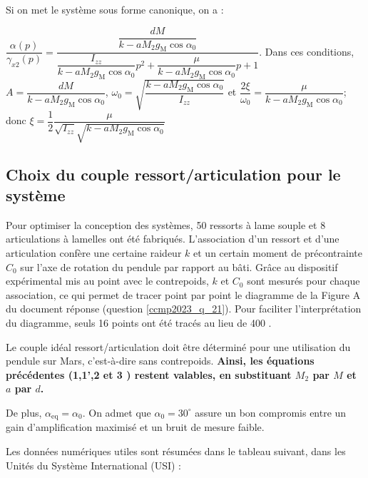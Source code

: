\ifprof
\begin{corrige}
Si on met le système sous forme canonique, on a :

$\dfrac{\alpha(p)}{\gamma_{x 2}(p)} = \dfrac{\dfrac{d M}{k -a M_{2} g_{\mathrm{M}}  \cos \alpha_{0}}}{\dfrac{I_{z z}}{k -a M_{2} g_{\mathrm{M}}  \cos \alpha_{0}} p^2  +\dfrac{\mu}{k -a M_{2} g_{\mathrm{M}}  \cos \alpha_{0}}p +1}$.
Dans ces conditions, $A=\dfrac{d M}{k -a M_{2} g_{\mathrm{M}}  \cos \alpha_{0}}$, $\omega_0 = \sqrt{
\dfrac{k -a M_{2} g_{\mathrm{M}}  \cos \alpha_{0}}{I_{z z}}
}$ 
et $\dfrac{2\xi}{\omega_0} = \dfrac{\mu}{k -a M_{2} g_{\mathrm{M}}  \cos \alpha_{0}}$; donc 
$\xi =  \dfrac{1}{2}\dfrac{\mu}{\sqrt{I_{z z}}\sqrt{k -a M_{2} g_{\mathrm{M}}  \cos \alpha_{0}}} 
$

\end{corrige}
\else
\fi

\subsection{Choix du couple ressort/articulation pour le système}
\ifprof
\else
Pour optimiser la conception des systèmes, 50 ressorts à lame souple et 8 articulations à lamelles ont été fabriqués. L'association d'un ressort et d'une articulation confère une certaine raideur $k$ et un certain moment de précontrainte $C_{0}$ sur l'axe de rotation du pendule par rapport au bâti. Grâce au dispositif expérimental mis au point avec le contrepoids, $k$ et $C_{0}$ sont mesurés pour chaque association, ce qui permet de tracer point par point le diagramme de la Figure A du document réponse (question \ref{ccmp2023_q_21}). Pour faciliter l'interprétation du diagramme, seuls 16 points ont été tracés au lieu de 400 .

Le couple idéal ressort/articulation doit être déterminé pour une utilisation du pendule sur Mars, c'est-à-dire sans contrepoids. \textbf{Ainsi, les équations précédentes (1,1',2 et 3 ) restent valables, en substituant $M_{2}$ par $M$ et $a$ par $d$.}

De plus, $\alpha_{\mathrm{eq}}=\alpha_{0}$. On admet que $\alpha_{0}=30^{\circ}$ assure un bon compromis entre un gain d'amplification maximisé et un bruit de mesure faible.

Les données numériques utiles sont résumées dans le tableau suivant, dans les Unités du Système International (USI) :

